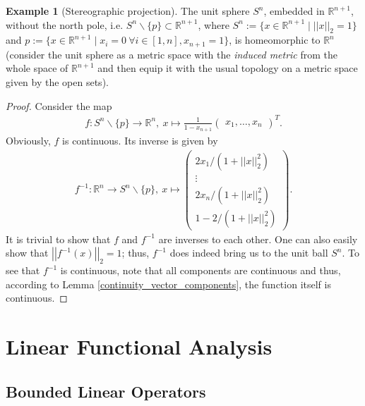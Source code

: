 \documentclass[12pt, a4paper]{article}
\numberwithin{equation}{section}
\theoremstyle{definition}
\theoremstyle{definition}
\newtheorem{exmp}[thm]{Example} %
\newcommand{\norm}[2]{\left\vert\left\vert #1 \right\vert\right\vert_{#2}}
\begin{document}
		\begin{exmp}[Stereographic projection]
			The unit sphere $S^n$, embedded in $\mathbb R^{n+1}$, without the north pole, i.e. $S^n\backslash \{p\} \subset \mathbb R^{n+1}$, where $S^n := \{ x\in\mathbb R^{n+1} \mid \norm{x}{2} = 1 \}$ and $p := \{ x\in\mathbb R^{n+1} \mid x_i = 0 \ \forall i\in[1, n], x_{n+1} = 1 \}$, is homeomorphic to $\mathbb R^n$ (consider the unit sphere as a metric space with the \textit{induced metric} from the whole space of $\mathbb R^{n+1}$ and then equip it with the usual topology on a metric space given by the open sets). 
		\end{exmp}
		\begin{proof}
			Consider the map 
			\begin{align}
				f: S^n\backslash\{p\}\rightarrow \mathbb R^n, \ x\mapsto \frac{1}{1-x_{n+1}}\begin{pmatrix} x_1, \dots, x_n \end{pmatrix}^T. 
			\end{align}
			Obviously, $f$ is continuous. Its inverse is given by 
			\begin{align}\label{stereographic_map_inverse}
				f^{-1}: \mathbb R^n \rightarrow S^n\backslash\{p\}, \ x\mapsto \begin{pmatrix} 2x_1/ \left(1+\norm{x}{2}^2\right)\\ \vdots\\ 2x_n/\left(1+\norm{x}{2}^2\right) \\[4pt] 1-2/\left(1+\norm{x}{2}^2\right) \end{pmatrix}.  
			\end{align}
			It is trivial to show that $f$ and $f^{-1}$ are inverses to each other. One can also easily show that $\norm{f^{-1}(x)}{2} = 1$; thus, $f^{-1}$ does indeed bring us to the unit ball $S^n$. 
			To see that $f^{-1}$ is continuous, note that all components are continuous and thus, according to Lemma \ref{continuity_vector_components}, the function itself is continuous. 
		\end{proof} 
			
	\newpage 
	\section{Linear Functional Analysis}

	\subsection{Bounded Linear Operators}
\end{document}
